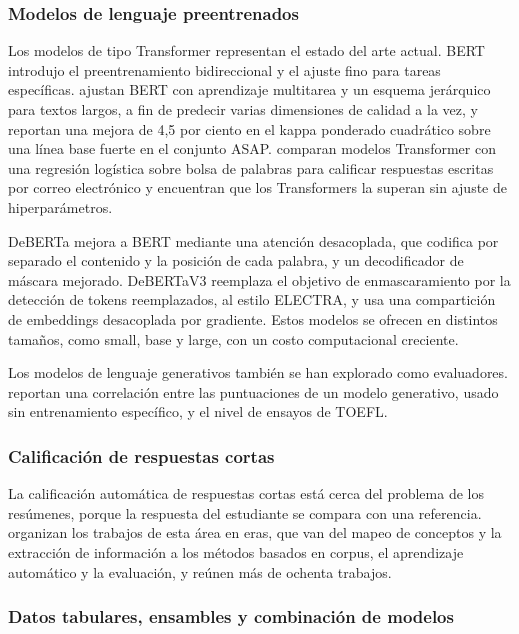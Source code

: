 \documentclass[11pt,a4paper]{article}
\begin{document}
\subsubsection{Modelos de lenguaje preentrenados}

Los modelos de tipo Transformer representan el estado del arte actual. BERT \citep{devlin2019} introdujo el preentrenamiento bidireccional y el ajuste fino para tareas específicas. \citet{xue2021} ajustan BERT con aprendizaje multitarea y un esquema jerárquico para textos largos, a fin de predecir varias dimensiones de calidad a la vez, y reportan una mejora de 4,5 por ciento en el kappa ponderado cuadrático sobre una línea base fuerte en el conjunto ASAP. \citet{ludwig2021} comparan modelos Transformer con una regresión logística sobre bolsa de palabras para calificar respuestas escritas por correo electrónico y encuentran que los Transformers la superan sin ajuste de hiperparámetros.

DeBERTa \citep{he2021} mejora a BERT mediante una atención desacoplada, que codifica por separado el contenido y la posición de cada palabra, y un decodificador de máscara mejorado. DeBERTaV3 \citep{he2023} reemplaza el objetivo de enmascaramiento por la detección de tokens reemplazados, al estilo ELECTRA, y usa una compartición de embeddings desacoplada por gradiente. Estos modelos se ofrecen en distintos tamaños, como small, base y large, con un costo computacional creciente.

Los modelos de lenguaje generativos también se han explorado como evaluadores. \citet{mizumoto2023} reportan una correlación entre las puntuaciones de un modelo generativo, usado sin entrenamiento específico, y el nivel de ensayos de TOEFL.

\subsubsection{Calificación de respuestas cortas}

La calificación automática de respuestas cortas está cerca del problema de los resúmenes, porque la respuesta del estudiante se compara con una referencia. \citet{burrows2015} organizan los trabajos de esta área en eras, que van del mapeo de conceptos y la extracción de información a los métodos basados en corpus, el aprendizaje automático y la evaluación, y reúnen más de ochenta trabajos.

\subsubsection{Datos tabulares, ensambles y combinación de modelos}
\end{document}
